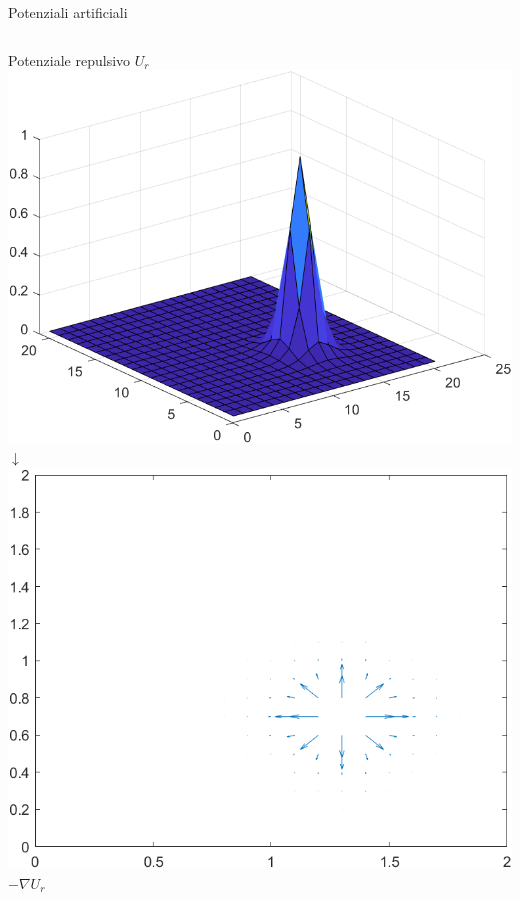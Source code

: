 \documentclass[handout]{beamer}
\begin{document}
\begin{frame}{Potenziali artificiali}
\begin{columns}
	\centering
	{\small Potenziale repulsivo $U_r$}
	\includegraphics[scale=0.28]{potR.png} \\
	$\downarrow$\\
	\includegraphics[scale=0.28]{antigradR.png} \\
	$-\nabla U_r$
\end{columns}
\end{frame}
\end{document}
